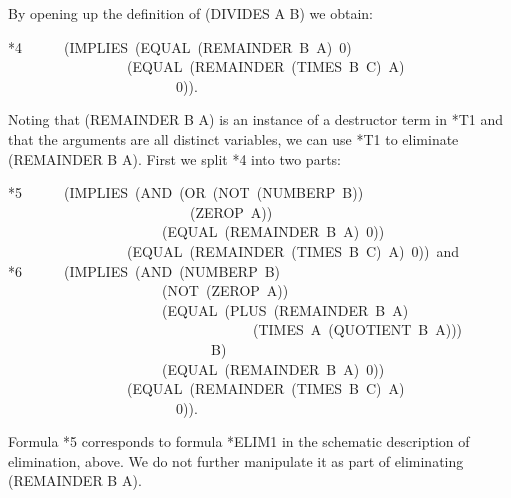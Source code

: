 \documentclass[11pt]{book}
\newenvironment{pubasis}{\begin{flushleft}\ttfamily\small}{\normalsize\rmfamily\end{flushleft}}
\begin{document}
By opening up the definition of (DIVIDES A B) we obtain:
\begin{pubasis}
*4~~~~~~(IMPLIES~(EQUAL~(REMAINDER~B~A)~0)\\
~~~~~~~~~~~~~~~~~(EQUAL~(REMAINDER~(TIMES~B~C)~A)\\
~~~~~~~~~~~~~~~~~~~~~~~~0)).\\
\end{pubasis}
Noting that (REMAINDER B A) is an instance of a destructor term in *T1
and that the arguments are all distinct variables, we can use *T1 to
eliminate (REMAINDER B A).  First we split *4 into two parts:
\begin{pubasis}
*5~~~~~~(IMPLIES~(AND~(OR~(NOT~(NUMBERP~B))\\
~~~~~~~~~~~~~~~~~~~~~~~~~~(ZEROP~A))\\
~~~~~~~~~~~~~~~~~~~~~~(EQUAL~(REMAINDER~B~A)~0))\\
~~~~~~~~~~~~~~~~~(EQUAL~(REMAINDER~(TIMES~B~C)~A)~0))~and\\

*6~~~~~~(IMPLIES~(AND~(NUMBERP~B)\\
~~~~~~~~~~~~~~~~~~~~~~(NOT~(ZEROP~A))\\
~~~~~~~~~~~~~~~~~~~~~~(EQUAL~(PLUS~(REMAINDER~B~A)\\
~~~~~~~~~~~~~~~~~~~~~~~~~~~~~~~~~~~(TIMES~A~(QUOTIENT~B~A)))\\
~~~~~~~~~~~~~~~~~~~~~~~~~~~~~B)\\
~~~~~~~~~~~~~~~~~~~~~~(EQUAL~(REMAINDER~B~A)~0))\\
~~~~~~~~~~~~~~~~~(EQUAL~(REMAINDER~(TIMES~B~C)~A)\\
~~~~~~~~~~~~~~~~~~~~~~~~0)).\\
\end{pubasis}
Formula *5 corresponds to formula *ELIM1 in the schematic description
of elimination, above.  We do not further manipulate it as part
of eliminating (REMAINDER B A).
\end{document}
